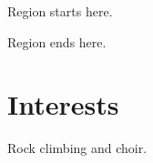 \documentclass[11pt,a4paper]{moderncv}
\begin{document}
Region starts here.


Region ends here.

\section{Interests}
Rock climbing and choir.
\end{document}
